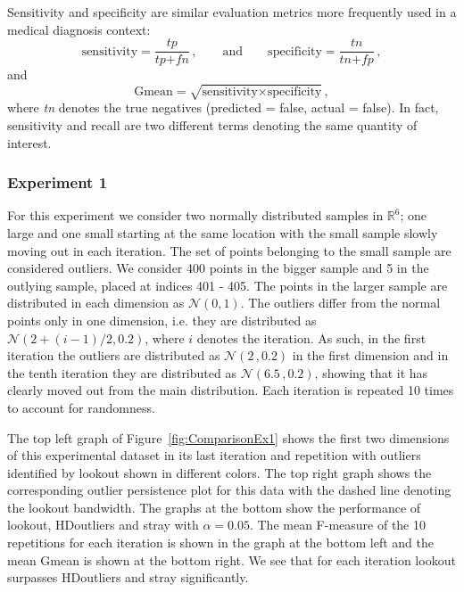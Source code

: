 \documentclass[letter,12pt]{article}
\begin{document}
Sensitivity and specificity are similar evaluation metrics more frequently used in a medical diagnosis context: 
\begin{equation}\label{eq:ss}
    \text{sensitivity} =  \frac{ \textit{tp} }{\textit{tp} + \textit{fn}} \, ,  \qquad \text{and} \qquad \text{specificity} = \frac{\textit{tn}}{\textit{tn} + \textit{fp}} \, ,
\end{equation}
and 
\begin{equation}\label{eq:gmean}
    \text{Gmean} =  \sqrt{ \text{sensitivity} \times \text{specificity}} \, , 
\end{equation}
where \textit{tn} denotes the true negatives (predicted = false, actual = false). In fact, sensitivity and recall are two different terms denoting the same quantity of interest. 


\subsubsection{Experiment 1}\label{sec:exp1}
For this experiment we consider two normally distributed samples in  $\mathbb{R}^6$; one large and one small  starting at the same location with the small sample slowly moving out in each iteration. The set of points belonging to the small sample are considered outliers. We consider 400 points in the bigger sample and 5 in the outlying sample, placed at indices 401 - 405. The points in the larger sample are distributed in each dimension as $\mathscr{N}(0, 1)$. The outliers differ from the normal points only in one dimension, i.e. they are distributed as $\mathscr{N}\left(2 + (i-1)/2, 0.2 \right)$, where $i$ denotes the iteration. As such, in the first iteration the outliers are distributed as $\mathscr{N}\left(2 \, , 0.2 \right)$ in the first dimension and in the tenth iteration they are distributed as $\mathscr{N}\left(6.5 \, , 0.2 \right)$, showing that it has clearly moved out from the main distribution. Each iteration is repeated 10 times to account for randomness.

The top left graph of Figure~\ref{fig:ComparisonEx1} shows the first two dimensions of this experimental dataset in its last iteration and repetition with outliers identified by lookout shown in different colors. The top right graph shows the corresponding outlier persistence plot for this data with the dashed line denoting the lookout bandwidth. The graphs at the bottom show the performance of lookout, HDoutliers and stray with $\alpha = 0.05$. The mean F-measure of the 10 repetitions for each iteration is shown in the graph at the bottom left and the mean Gmean is shown at the bottom right. We see that for each iteration lookout surpasses HDoutliers and stray significantly. 
\end{document}
